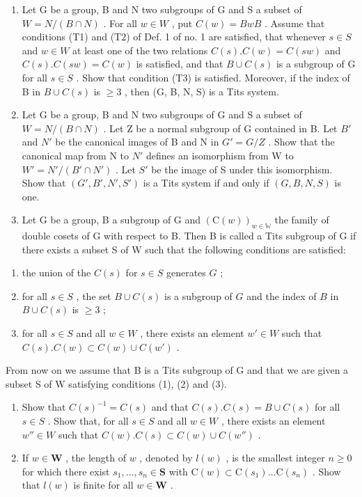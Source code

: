 
\begin{enumerate}
\def\labelenumi{\arabic{enumi})}
\item
  Let G be a group, B and N two subgroups of G and S a subset of \(W = N/(B \cap N)\) . For all \(w \in W\) , put \(C(w) = BwB\) . Assume that conditions (T1) and (T2) of Def. 1 of no. 1 are satisfied, that whenever \(s \in S\) and \(w \in W\) at least one of the two relations \(C(s).C(w) = C(sw)\) and \(C(s).C(sw) = C(w)\) is satisfied, and that \(B \cup C(s)\) is a subgroup of G for all \(s \in S\) . Show that condition (T3) is satisfied. Moreover, if the index of B in \(B \cup C(s)\) is \(\geqslant 3\) , then (G, B, N, S) is a Tits system.
\item
  Let G be a group, B and N two subgroups of G and S a subset of \(W = N/(B \cap N)\) . Let Z be a normal subgroup of G contained in B. Let \(B'\) and \(N'\) be the canonical images of B and N in \(G' = G/Z\) . Show that the canonical map from N to \(N'\) defines an isomorphism from W to \(W' = N'/(B' \cap N')\) . Let \(S'\) be the image of S under this isomorphism. Show that \((G', B', N', S')\) is a Tits system if and only if \((G, B, N, S)\) is one.
\item
  Let G be a group, B a subgroup of G and \((\mathrm{C}(w))_{w\in\mathbb{W}}\) the family of double cosets of G with respect to B. Then B is called a Tits subgroup of G if there exists a subset S of W such that the following conditions are satisfied:
\end{enumerate}

\begin{enumerate}
\def\labelenumi{(\arabic{enumi})}
\item
  the union of the \(C(s)\) for \(s \in S\) generates \(G\) ;
\item
  for all \(s \in S\) , the set \(B \cup C(s)\) is a subgroup of \(G\) and the index of \(B\) in \(B \cup C(s)\) is \(\geqslant 3\) ;
\item
  for all \(s \in S\) and all \(w \in W\) , there exists an element \(w' \in W\) such that \(C(s).C(w) \subset C(w) \cup C(w')\) .
\end{enumerate}

From now on we assume that B is a Tits subgroup of G and that we are given a subset S of W satisfying conditions (1), (2) and (3).

\begin{enumerate}
\def\labelenumi{\alph{enumi})}
\item
  Show that \(C(s)^{-1} = C(s)\) and that \(C(s).C(s) = B \cup C(s)\) for all \(s \in S\) . Show that, for all \(s \in S\) and all \(w \in W\) , there exists an element \(w'' \in W\) such that \(C(w).C(s) \subset C(w) \cup C(w'')\) .
\item
  If \(w \in \mathbf{W}\) , the length of \(w\) , denoted by \(l(w)\) , is the smallest integer \(n \geqslant 0\) for which there exist \(s_1, \ldots, s_n \in \mathbf{S}\) with \(\mathrm{C}(w) \subset \mathrm{C}(s_1) \ldots \mathrm{C}(s_n)\) . Show that \(l(w)\) is finite for all \(w \in \mathbf{W}\) .
\end{enumerate}


